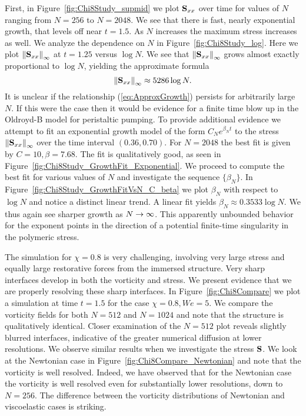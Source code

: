 First, in Figure~\ref{fig:Chi8Study_supmid} we plot $\mathbf{S}_{xx}$ over time for values of $N$ ranging from $N=256$ to $N=2048$. We see that there is fast, nearly exponential growth, that levels off near $t=1.5$. As $N$ increases the maximum stress increases as well. We analyze the dependence on $N$ in Figure~\ref{fig:Chi8Study_log}. Here we plot $\left\lVert\mathbf{S}_{xx}\right\rVert_{\infty}$ at $t=1.25$ versus $\log N$. We see that $\left\lVert\mathbf{S}_{xx}\right\rVert_{\infty}$ grows almost exactly proportional to $\log N$, yielding the approximate formula
\begin{equation}
\left\lVert\mathbf{S}_{xx}\right\rVert_{\infty} \approx 5286\log N.
\label{eq:ApproxGrowth}
\end{equation}
It is unclear if the relationship (\ref{eq:ApproxGrowth}) persists for arbitrarily large $N$. If this were the case then it would be evidence for a finite time blow up in the Oldroyd-B model for peristaltic pumping. To provide additional evidence we attempt to fit an exponential growth model of the form $C_Ne^{\beta_N t}$ to the stress $\left\lVert\mathbf{S}_{xx}\right\rVert_{\infty}$ over the time interval $(0.36,0.70)$. For $N=2048$ the best fit is given by $C=10, \beta=7.68$. The fit is qualitatively good, as seen in Figure~\ref{fig:Chi8Study_GrowthFit_Exponential}. We proceed to compute the best fit for various values of $N$ and investigate the sequence $\{\beta_N\}$. In Figure~\ref{fig:Chi8Study_GrowthFitVsN_C_beta} we plot $\beta_N$ with respect to $\log N$ and notice a distinct linear trend. A linear fit yields $\beta_N\approx 0.3533\log N$. We thus again see sharper growth as $N\rightarrow\infty$. This apparently unbounded behavior for the exponent points in the direction of a potential finite-time singularity in the polymeric stress. 

The simulation for $\chi=0.8$ is very challenging, involving very large stress and equally large restorative forces from the immersed structure. Very sharp interfaces develop in both the vorticity and stress. We present evidence that we are properly resolving these sharp interfaces. In Figure~\ref{fig:Chi8Compare} we plot a simulation at time $t=1.5$ for the case $\chi=0.8, We=5$. We compare the vorticity fields for both $N=512$ and $N=1024$ and note that the structure is qualitatively identical. Closer examination of the $N=512$ plot reveals slightly blurred interfaces, indicative of the greater numerical diffusion at lower resolutions. We observe similar results when we investigate the stress $\mathbf{S}$. We look at the Newtonian case in Figure~\ref{fig:Chi8Compare_Newtonian} and note that the vorticity is well resolved. Indeed, we have observed that for the Newtonian case the vorticity is well resolved even for substantially lower resolutions, down to $N=256$. The difference between the vorticity distributions of Newtonian and viscoelastic cases is striking. 


